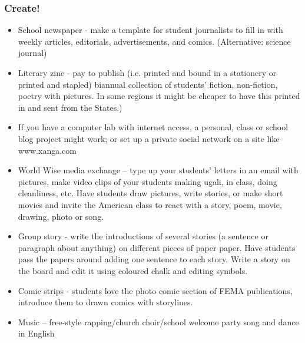 \documentclass[12pt,a4paper]{report}
\begin{document}
\subsubsection{Create!}
\begin{itemize}
\item{School newspaper - make a template for student journalists to fill in with weekly articles, editorials, advertisements, and comics. (Alternative: science journal)}

\item{Literary zine - pay to publish (i.e. printed and bound in a stationery or printed and stapled) biannual collection of students' fiction, non-fiction, poetry with pictures. In some regions it might be cheaper to have this printed in and sent from the States.)}

\item{If you have a computer lab with internet access, a personal, class or school blog project might work; or set up a private social network on a site like www.xanga.com}

\item{World Wise media exchange – type up your students’ letters in an email with pictures, make video clips of your students making ugali, in class, doing cleanliness, etc. Have students draw pictures, write stories, or make short movies and invite the American class to react with a story, poem, movie, drawing, photo or song.}

\item{Group story - write the introductions of several stories (a sentence or paragraph about anything) on different pieces of paper paper. Have students pass the papers around adding one sentence to each story. Write a story on the board and edit it using coloured chalk and editing symbols.}

\item{Comic strips - students love the photo comic section of FEMA publications, introduce them to drawn comics with storylines.}

\item{Music – free-style rapping/church choir/school welcome party song and dance in English}

\end{itemize}
\end{document}
